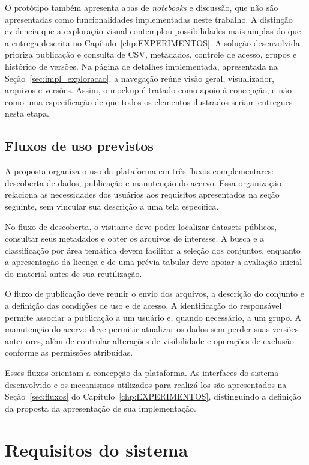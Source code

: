O protótipo também apresenta abas de \textit{notebooks} e discussão, que não são apresentadas como funcionalidades implementadas neste trabalho. A distinção evidencia que a exploração visual contemplou possibilidades mais amplas do que a entrega descrita no Capítulo~\ref{chp:EXPERIMENTOS}. A solução desenvolvida prioriza publicação e consulta de CSV, metadados, controle de acesso, grupos e histórico de versões. Na página de detalhes implementada, apresentada na Seção~\ref{sec:impl_exploracao}, a navegação reúne visão geral, visualizador, arquivos e versões. Assim, o mockup é tratado como apoio à concepção, e não como uma especificação de que todos os elementos ilustrados seriam entregues nesta etapa.

\subsection{Fluxos de uso previstos}\label{sec:fluxos_propostos}

A proposta organiza o uso da plataforma em três fluxos complementares: descoberta de dados, publicação e manutenção do acervo. Essa organização relaciona as necessidades dos usuários aos requisitos apresentados na seção seguinte, sem vincular sua descrição a uma tela específica.

No fluxo de descoberta, o visitante deve poder localizar datasets públicos, consultar seus metadados e obter os arquivos de interesse. A busca e a classificação por área temática devem facilitar a seleção dos conjuntos, enquanto a apresentação da licença e de uma prévia tabular deve apoiar a avaliação inicial do material antes de sua reutilização.

O fluxo de publicação deve reunir o envio dos arquivos, a descrição do conjunto e a definição das condições de uso e de acesso. A identificação do responsável permite associar a publicação a um usuário e, quando necessário, a um grupo. A manutenção do acervo deve permitir atualizar os dados sem perder suas versões anteriores, além de controlar alterações de visibilidade e operações de exclusão conforme as permissões atribuídas.

Esses fluxos orientam a concepção da plataforma. As interfaces do sistema desenvolvido e os mecanismos utilizados para realizá-los são apresentados na Seção~\ref{sec:fluxos} do Capítulo~\ref{chp:EXPERIMENTOS}, distinguindo a definição da proposta da apresentação de sua implementação.

\section{Requisitos do sistema}

